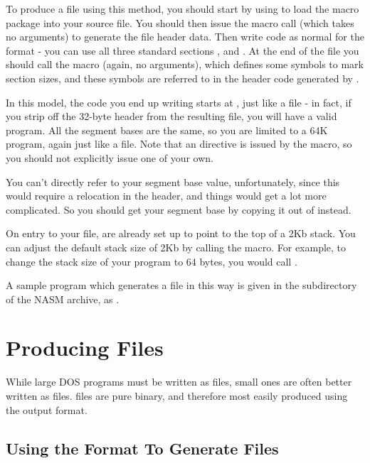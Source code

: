 To produce a  file using this method, you should start by
using  to load the  macro package into
your source file. You should then issue the  macro call
(which takes no arguments) to generate the file header data. Then
write code as normal for the  format - you can use all three
standard sections ,  and . At the end of
the file you should call the  macro (again, no arguments),
which defines some symbols to mark section sizes, and these symbols
are referred to in the header code generated by .

In this model, the code you end up writing starts at , just
like a  file - in fact, if you strip off the 32-byte header
from the resulting  file, you will have a valid 
program. All the segment bases are the same, so you are limited to a
64K program, again just like a  file. Note that an 
directive is issued by the  macro, so you should not
explicitly issue one of your own.

You can't directly refer to your segment base value, unfortunately,
since this would require a relocation in the header, and things
would get a lot more complicated. So you should get your segment
base by copying it out of  instead.

On entry to your  file,  are already set up to
point to the top of a 2Kb stack. You can adjust the default stack
size of 2Kb by calling the  macro. For example, to
change the stack size of your program to 64 bytes, you would call
.

A sample program which generates a  file in this way is
given in the  subdirectory of the NASM archive, as
.

\section{Producing  Files}
\label{sec:comfiles}

While large DOS programs must be written as  files, small
ones are often better written as  files.  files are
pure binary, and therefore most easily produced using the 
output format.

\subsection{Using the  Format To Generate  Files}
\label{subsec:combinfmt}


